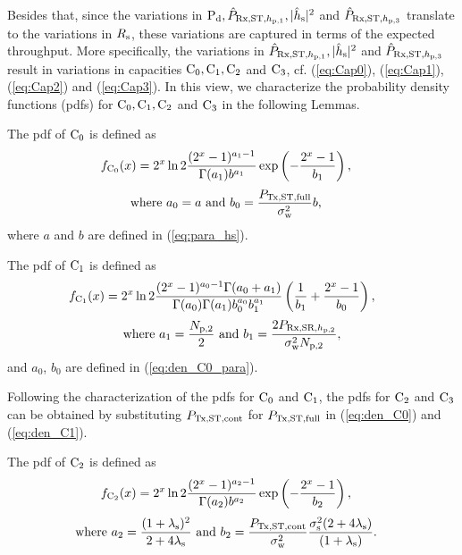 Besides that, since the variations in $\text{P}_{\text{d}}, \hat{P}_{\text{Rx,ST,$h_{\text{p,1}}$}}, |\hat{h}_{\text{s}}|^2$ and $\hat{P}_{\text{Rx,ST,$h_{\text{p,3}}$}}$ translate to the variations in $R_{\text{s}}$, these variations are captured in terms of the expected throughput. More specifically, the variations in $\hat{P}_{\text{Rx,ST,$h_{\text{p,1}}$}}, |\hat{h}_{\text{s}}|^2$ and $\hat{P}_{\text{Rx,ST,$h_{\text{p,3}}$}}$ result in variations in capacities $\text{C}_0, \text{C}_1, \text{C}_2$ and $\text{C}_3$, cf. (\ref{eq:Cap0}), (\ref{eq:Cap1}), (\ref{eq:Cap2}) and (\ref{eq:Cap3}). In this view, we characterize the probability density functions (pdfs) for $\text{C}_0, \text{C}_1, \text{C}_2$ and $\text{C}_3$ in the following Lemmas.
\begin{lemma} \label{lm:lem3}
\normalfont
The pdf of $\text{C}_0$ is defined as \cite{Kaushik16}
\begin{align}
\dcz(x) &= 2^x \ln 2 \frac{(2^x - 1)^{a_1 - 1}}{\Gamma(a_1) b^{a_1}} \exp\left(-\frac{2^x - 1}{b_1}\right),  \label{eq:den_C0}
\end{align}
\vspace{-4mm}
\begin{align}
\text{where  } a_0 = a &\text{ and } b_0 = \frac{\pfull}{\npo} b,  \label{eq:den_C0_para} 
\end{align}
where $a$ and $b$ are defined in (\ref{eq:para_hs}).
\end{lemma}

\begin{lemma} \label{lm:lem4}
\normalfont
The pdf of $\text{C}_1$ is defined as \cite{Kaushik16}
\begin{align}
\hspace{-2mm}
\dco(x) &= 2^x \ln 2 \frac{(2^x - 1)^{a_0 - 1} \Gamma(a_0 + a_1)}{\Gamma(a_0) \Gamma(a_1) b_0^{a_0} b_1^{a_1}} \left(\frac{1}{b_1} + \frac{2^x - 1}{b_0}\right), \label{eq:den_C1}
\end{align}
\vspace{-4mm}
\begin{align}
\text{where  } a_1 = \frac{\Kp}{2}  \text{  and  } b_1 = \frac{2 \prcvdsr}{\npo \Kp}, \label{eq:den_C1_para} 
\end{align}
and $a_0$, $b_0$ are defined in (\ref{eq:den_C0_para}).
\end{lemma}
Following the characterization of the pdfs for $\text{C}_0$ and $\text{C}_1$, the pdfs for $\text{C}_2$ and $\text{C}_3$ can be obtained by substituting $P_{\text{Tx,ST,cont}}$ for $P_{\text{Tx,ST,full}}$ in (\ref{eq:den_C0}) and (\ref{eq:den_C1}).
\begin{lemma} \label{lm:lem5}
\normalfont
The pdf of $\text{C}_2$ is defined as
\begin{align}
\dctw(x) &= 2^x \ln 2 \frac{(2^x - 1)^{a_2 - 1}}{\Gamma(a_2) b^{a_2}} \exp\left(-\frac{2^x - 1}{b_2}\right),  \label{eq:den_C2}
\end{align}
\vspace{-4mm}
\begin{align}
\text{where  } a_2 = \frac{(1 + \ls)^2}{2 + 4 \ls} &\text{ and } b_2 = \frac{\preg}{\npo}\frac{\nps (2 + 4 \ls)}{(1 + \ls)}.  \label{eq:den_C2_para} 
\end{align}
\end{lemma}

